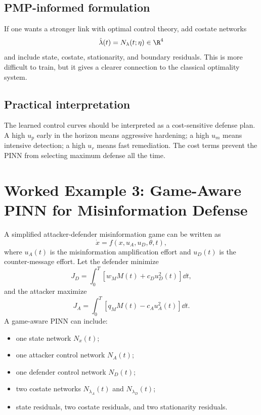 \documentclass[11pt,a4paper]{article}
\begin{document}
\subsection{PMP-informed formulation}
If one wants a stronger link with optimal control theory, add costate networks
\begin{equation}
    \hat{\lambda}(t)=N_\lambda(t;\eta)\in\R^4
\end{equation}
and include state, costate, stationarity, and boundary residuals. This is more difficult to train, but it gives a clearer connection to the classical optimality system.

\subsection{Practical interpretation}
The learned control curves should be interpreted as a cost-sensitive defense plan. A high $u_p$ early in the horizon means aggressive hardening; a high $u_m$ means intensive detection; a high $u_r$ means fast remediation. The cost terms prevent the PINN from selecting maximum defense all the time.

\section{Worked Example 3: Game-Aware PINN for Misinformation Defense}

A simplified attacker-defender misinformation game can be written as
\begin{equation}
    \dot{x}=f(x,u_A,u_D,\theta,t),
\end{equation}
where $u_A(t)$ is the misinformation amplification effort and $u_D(t)$ is the counter-message effort. Let the defender minimize
\begin{equation}
    J_D=\int_0^T\left[w_M M(t)+c_Du_D^2(t)\right]\dd t,
\end{equation}
and the attacker maximize
\begin{equation}
    J_A=\int_0^T\left[q_M M(t)-c_Au_A^2(t)\right]\dd t.
\end{equation}
A game-aware PINN can include:
\begin{itemize}[leftmargin=2em]
    \item one state network $N_x(t)$;
    \item one attacker control network $N_A(t)$;
    \item one defender control network $N_D(t)$;
    \item two costate networks $N_{\lambda_A}(t)$ and $N_{\lambda_D}(t)$;
    \item state residuals, two costate residuals, and two stationarity residuals.
\end{itemize}
\end{document}
